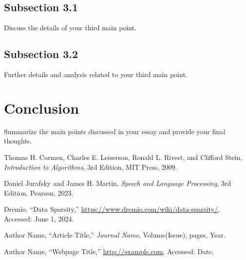 \documentclass[12pt]{article}
\begin{document}
\subsection{Subsection 3.1}
Discuss the details of your third main point.
\subsection{Subsection 3.2}
Further details and analysis related to your third main point.

\section{Conclusion}
Summarize the main points discussed in your essay and provide your final thoughts.

\newpage
\begin{thebibliography}{9}

Thomas H. Cormen, Charles E. Leiserson, Ronald L. Rivest, and Clifford Stein, \textit{Introduction to Algorithms}, 3rd Edition, MIT Press, 2009.

Daniel Jurafsky and James H. Martin, \textit{Speech and Language Processing}, 3rd Edition, Pearson, 2023.

Dremio, ``Data Sparsity,'' \url{https://www.dremio.com/wiki/data-sparsity/}, Accessed: June 1, 2024.

Author Name, ``Article Title,'' \textit{Journal Name}, Volume(Issue), pages, Year.

Author Name, ``Webpage Title,'' \url{http://example.com}, Accessed: Date.

\end{thebibliography}
\end{document}
